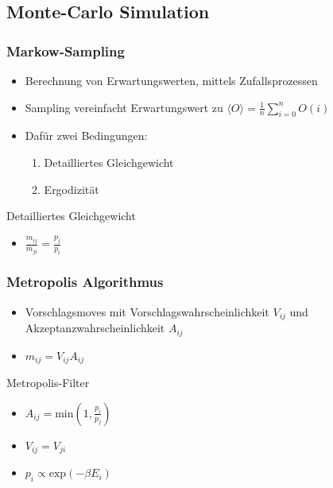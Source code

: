 \subsection{Monte-Carlo Simulation}

\begin{frame}
  \frametitle{Markow-Sampling}
  \begin{itemize}
    \item Berechnung von Erwartungswerten, mittels Zufallsprozessen
    \item Sampling vereinfacht Erwartungswert zu $\langle O \rangle = \frac{1}{n} \sum_{i=0}^n O(i)$
    \item Dafür zwei Bedingungen: \\
          \begin{enumerate}
            \item Detailliertes Gleichgewicht
            \item Ergodizität
          \end{enumerate}
  \end{itemize}
  \begin{block}{Detailliertes Gleichgewicht}
    \begin{itemize}
      \item $\frac{m_{ij}}{m_{ji}} = \frac{p_j}{p_i}$
    \end{itemize}
  \end{block}
\end{frame}

\begin{frame}
  \frametitle{Metropolis Algorithmus}
  \begin{itemize}
    \item Vorschlagsmoves mit Vorschlagswahrscheinlichkeit $V_{ij}$
    und Akzeptanzwahrscheinlichkeit $A_{ij}$
    \item $m_{ij} = V_{ij}A_{ij}$
  \end{itemize}
  \begin{block}{Metropolis-Filter}
    \begin{itemize}
      \item $A_{ij} = \text{min}( 1, \frac{p_i}{p_j})$
      \item $V_{ij} = V_{ji}$
    \end{itemize}
  \end{block}
  \begin{itemize}
    \item $p_i \propto \text{exp}(-\beta E_i)$
  \end{itemize}
\end{frame}

